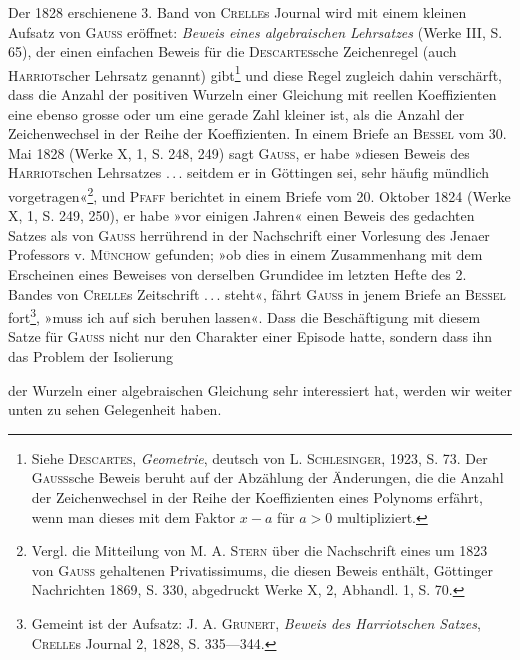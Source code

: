 \begin{center}\end{center}
\noindent\hspace*{\parindent}Der 1828 erschienene 3. Band von \textsc{Crelle}s Journal wird mit einem
kleinen Aufsatz von \textsc{Gauss} eröffnet: \textit{Beweis eines algebraischen Lehrsatzes} (Werke
III, S. 65), der einen einfachen Beweis für die \textsc{Descartes}sche Zeichenregel
(auch \textsc{Harriot}scher Lehrsatz genannt) gibt\footnote{Siehe \textsc{Descartes}, \textit{Geometrie}, deutsch von L. \textsc{Schlesinger}, 1923, S. 73. Der \textsc{Gauss}sche Beweis beruht auf der Abzählung der Änderungen, die die Anzahl der Zeichenwechsel in der Reihe der Koeffizienten eines Polynoms erfährt, wenn man dieses mit dem Faktor \(x-a\) für \(a>0\) multipliziert.} und diese Regel zugleich dahin
verschärft, dass die Anzahl der positiven Wurzeln einer Gleichung mit reellen
Koeffizienten eine ebenso grosse oder um eine gerade Zahl kleiner ist, als die Anzahl
der Zeichenwechsel in der Reihe der Koeffizienten. In einem Briefe an \textsc{Bessel}
vom 30. Mai 1828 (Werke X, 1, S. 248, 249) sagt \textsc{Gauss}, er habe »diesen
Beweis des \textsc{Harriot}schen Lehrsatzes \mbox{.\,.\,.} seitdem er in Göttingen sei, sehr
häufig mündlich vorgetragen«\footnote{Vergl. die Mitteilung von M. A. \textsc{Stern} über die Nachschrift eines um 1823 von \textsc{Gauss} gehaltenen Privatissimums, die diesen Beweis enthält, Göttinger Nachrichten 1869, S. 330, abgedruckt Werke X, 2, Abhandl. 1, S. 70.}, und \textsc{Pfaff} berichtet in einem Briefe vom
20. Oktober 1824 (Werke X, 1, S. 249, 250), er habe »vor einigen Jahren«
einen Beweis des gedachten Satzes als von \textsc{Gauss} herrührend in der Nachschrift
einer Vorlesung des Jenaer Professors v. \textsc{Münchow} gefunden; »ob dies
in einem Zusammenhang mit dem Erscheinen eines Beweises von derselben
Grundidee im letzten Hefte des 2. Bandes von \textsc{Crelle}s Zeitschrift \mbox{.\,.\,.} steht«,
fährt \textsc{Gauss} in jenem Briefe an \textsc{Bessel} fort\footnote{Gemeint ist der Aufsatz: J. A. \textsc{Grunert}, \textit{Beweis des Harriotschen Satzes}, \textsc{Crelle}s Journal 2, 1828, S. 335—344.}, »muss ich auf sich beruhen
lassen«. Dass die Beschäftigung mit diesem Satze für \textsc{Gauss} nicht nur
den Charakter einer Episode hatte, sondern dass ihn das Problem der Isolierung
\HistoricalFoot{}{24\textsuperscript{*}}
\par\clearpage{}
\noindent der Wurzeln einer algebraischen Gleichung sehr interessiert hat, werden wir
weiter unten zu sehen Gelegenheit haben.

